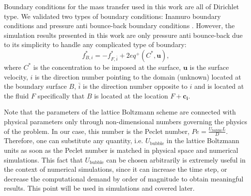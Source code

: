 \documentclass{article}
\newcommand{\beq}{\begin{equation}}
\newcommand{\feq}{\end{equation}}
\newcommand{\ububble}{U_{\mathrm{bubble}}}
\newcommand{\cstar}{C^{*}}
\begin{document}

Boundary conditions for the mass transfer used in this work are all of Dirichlet type. We validated
two types of boundary conditions: Inamuro boundary conditions \cite{inamuro-scalar-boundary} and
pressure anti bounce-back boundary conditions \cite{ginzburg-multireflection}. However, the
simulation results presented in this work are only pressure anti bounce-back due to its simplicity
to handle any complicated type of boundary:
\beq
\label{antibb}
f^{*}_{B,i}=-f^{*}_{F,\bar{i}} + 2 eq^+(\cstar,\bm{u}),
\feq
where $\cstar$ is the concentration to be imposed at the surface, $\bm{u}$ is the surface velocity,
$i$ is the direction number pointing to the domain (unknown) located at the boundary surface $B$,
$\bar{i}$ is the direction number opposite to $i$ and is located at the fluid $F$ specifically that
$B$ is located at the location $F+\bm{c_i}$. 

Note that the parameters of the lattice
Boltzmann scheme are connected with  physical parameters only through  non-dimensional
numbers governing the physics of the problem. In our case, this number is the Peclet number, $Pe=\frac{\ububble L}{D}$.
Therefore, one can substitute any quantity, i.e.
$\ububble$ in the lattice Boltzmann units as soon as the
Peclet number is  matched in physical space and numerical simulations. This fact that $\ububble$
can be chosen arbitrarily is extremely useful in the context of numerical simulations, since it can
increase the time step, or decrease the computational demand by order of magnitude to obtain
meaningful results. This point will be used in simulations and covered later. 
\end{document}
